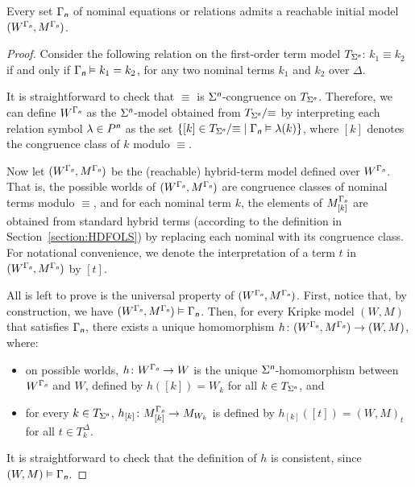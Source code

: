 \documentclass[a4paper,UKenglish,cleveref,autoref]{lipics-v2019}
\begin{document}
\begin{proposition}
  \label{proposition:HDCLSn-initiality}
  Every set\/ \(\Gamma_{\text{\normalfont\sffamily\itshape n}}\) of nominal equations or relations admits a reachable initial model \((W^{\Gamma_{\text{\normalfont\sffamily\itshape n}}}, M^{\Gamma_{\text{\normalfont\sffamily\itshape n}}})\).
\end{proposition}
\begin{proof}
  Consider the following relation on the first-order term model \(T_{\Sigma^{\text{\normalfont\sffamily\itshape n}}}\):
  \(k_{1} \equiv k_{2}\) if and only if \(\Gamma_{\text{\normalfont\sffamily\itshape n}} \vDash k_{1} = k_{2}\), for any two nominal terms \(k_{1}\) and \(k_{2}\) over \(\Delta\).

  It is straightforward to check that \(\equiv\) is \(\Sigma^{\text{\normalfont\sffamily\itshape n}}\)-congruence on \(T_{\Sigma^{\text{\normalfont\sffamily\itshape n}}}\).
  Therefore, we can define \(W^{\Gamma_{\text{\normalfont\sffamily\itshape n}}}\) as the \(\Sigma^{\text{\normalfont\sffamily\itshape n}}\)-model obtained from \(T_{\Sigma^{\text{\normalfont\sffamily\itshape n}}} /{\equiv}\) by interpreting each relation symbol \(\lambda \in P^{\text{\normalfont\sffamily\itshape n}}\) as the set \(\{ [k] \in T_{\Sigma^{\text{\normalfont\sffamily\itshape n}}} /{\equiv} \mid \Gamma_{\text{\normalfont\sffamily\itshape n}} \vDash \lambda(k) \}\), where \([k]\) denotes the congruence class of \(k\) modulo \(\equiv\).

  Now let \((W^{\Gamma_{\text{\normalfont\sffamily\itshape n}}}, M^{\Gamma_{\text{\normalfont\sffamily\itshape n}}})\) be the (reachable) hybrid-term model defined over \(W^{\Gamma_{\text{\normalfont\sffamily\itshape n}}}\).
  That is, the possible worlds of \((W^{\Gamma_{\text{\normalfont\sffamily\itshape n}}}, M^{\Gamma_{\text{\normalfont\sffamily\itshape n}}})\) are congruence classes of nominal terms modulo \(\equiv\), and for each nominal term \(k\), the elements of \(M^{\Gamma_{\text{\normalfont\sffamily\itshape n}}}_{[k]}\) are obtained from standard hybrid terms (according to the definition in Section~\ref{section:HDFOLS}) by replacing each nominal with its congruence class.
  For notational convenience, we denote the interpretation of a term \(t\) in \((W^{\Gamma_{\text{\normalfont\sffamily\itshape n}}}, M^{\Gamma_{\text{\normalfont\sffamily\itshape n}}})\) by \([t]\).

  All is left to prove is the universal property of \((W^{\Gamma_{\text{\normalfont\sffamily\itshape n}}}, M^{\Gamma_{\text{\normalfont\sffamily\itshape n}}})\).
  First, notice that, by construction, we have \((W^{\Gamma_{\text{\normalfont\sffamily\itshape n}}}, M^{\Gamma_{\text{\normalfont\sffamily\itshape n}}}) \vDash \Gamma_{\text{\normalfont\sffamily\itshape n}}\).
  Then, for every Kripke model \((W, M)\) that satisfies \(\Gamma_{\text{\normalfont\sffamily\itshape n}}\), there exists a unique homomorphism \(h \colon (W^{\Gamma_{\text{\normalfont\sffamily\itshape n}}}, M^{\Gamma_{\text{\normalfont\sffamily\itshape n}}}) \to (W, M)\), where:
  \begin{itemize}
  \item on possible worlds, \(h \colon W^{\Gamma_{\text{\normalfont\sffamily\itshape n}}} \to W\) is the unique \(\Sigma^{\text{\normalfont\sffamily\itshape n}}\)-homomorphism between \(W^{\Gamma_{\text{\normalfont\sffamily\itshape n}}}\) and \(W\), defined by \(h([k]) = W_{k}\) for all \(k \in T_{\Sigma^{\text{\normalfont\sffamily\itshape n}}}\), and 

  \item for every \(k \in T_{\Sigma^{\text{\normalfont\sffamily\itshape n}}}\), \(h_{[k]} \colon M^{\Gamma_{\text{\normalfont\sffamily\itshape n}}}_{[k]} \to M_{W_{k}}\) is defined by \(h_{[k]}([t]) = (W, M)_{t}\) for all \(t \in T^{\Delta}_{k}\).
  \end{itemize}
  It is straightforward to check that the definition of \(h\) is consistent, since \((W, M) \vDash \Gamma_{\text{\normalfont\sffamily\itshape n}}\).
\end{proof}
\end{document}
